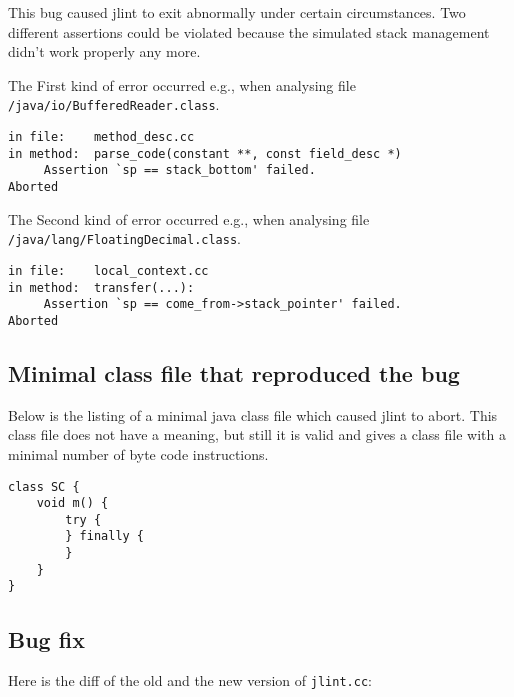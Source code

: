\documentclass[11pt,twoside,a4paper,draft]{article}
\begin{document}
This bug caused jlint to exit abnormally under certain circumstances.
Two different assertions could be violated because the simulated stack
management didn't work properly any more. 

The First kind of error occurred e.g., when analysing file \newline
\texttt{/java/io/BufferedReader.class}.

\begin{verbatim}
in file:    method_desc.cc
in method:  parse_code(constant **, const field_desc *)
	 Assertion `sp == stack_bottom' failed.
Aborted
\end{verbatim}

The Second kind of error occurred e.g., when analysing file \newline
\texttt{/java/lang/FloatingDecimal.class}.

\begin{verbatim}
in file:    local_context.cc
in method:  transfer(...):
	 Assertion `sp == come_from->stack_pointer' failed.
Aborted 
\end{verbatim}

\subsection {Minimal class file that reproduced the bug}

Below is the listing of a minimal java class file which caused jlint to abort.
This class file does not have a meaning, but still it is valid and gives a
class file with a minimal number of byte code instructions. 

\begin{verbatim}
class SC {
    void m() {
        try {
        } finally {
        }
    }
}
\end{verbatim}


\subsection {Bug fix}

Here is the diff of the old and the new version of \texttt{jlint.cc}:
\end{document}
